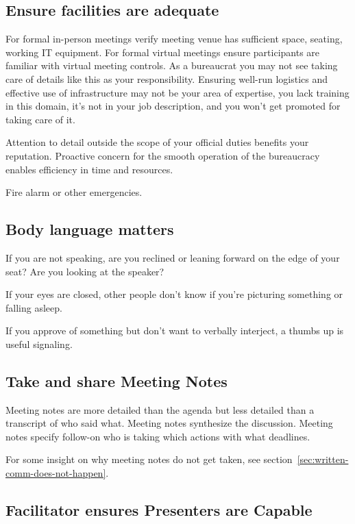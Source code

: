 \subsection*{Ensure facilities are adequate}
For formal in-person meetings verify meeting venue has sufficient space, seating, working IT equipment. For formal virtual meetings ensure participants are familiar with virtual meeting controls. 
As a bureaucrat you may not see taking care of details like this as your responsibility. Ensuring well-run logistics and effective use of infrastructure may not be your area of expertise, you lack training in this domain, it's not in your job description, and you won't get promoted for taking care of it. 

Attention to detail outside the scope of your official duties benefits your reputation. Proactive concern for the smooth operation of the bureaucracy enables efficiency in time and resources.


Fire alarm or other emergencies. 

\subsection*{Body language matters}

If you are not speaking, are you reclined or leaning forward on the edge of your seat? Are you looking at the speaker?

If your eyes are closed, other people don't know if you're picturing something or falling asleep. 

If you approve of something but don't want to verbally interject, a thumbs up is useful signaling. 

\subsection*{Take and share Meeting Notes}

Meeting notes are more detailed than the agenda but less detailed than a transcript of who said what. Meeting notes synthesize the discussion. Meeting notes specify follow-on who is taking which actions with what deadlines. 

For some insight on why meeting notes do not get taken, see section~\ref{sec:written-comm-does-not-happen}. 

\subsection*{Facilitator ensures Presenters are Capable}

